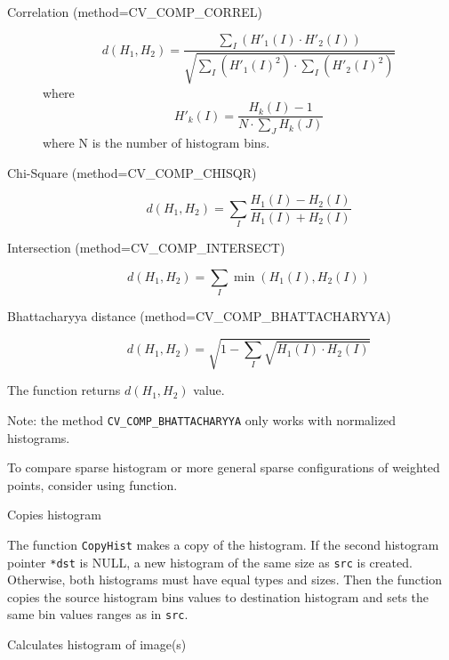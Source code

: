 \begin{description}
\item[Correlation (method=CV\_COMP\_CORREL)]
\[
d(H_1,H_2) = \frac
{\sum_I (H'_1(I) \cdot H'_2(I))}
{\sqrt{\sum_I(H'_1(I)^2) \cdot \sum_I(H'_2(I)^2)}}
\]
where
\[
H'_k(I) = \frac{H_k(I) - 1}{N \cdot \sum_J H_k(J)}
\]
where N is the number of histogram bins.

\item[Chi-Square (method=CV\_COMP\_CHISQR)]
\[ d(H_1,H_2) = \sum_I \frac{H_1(I)-H_2(I)}{H_1(I)+H_2(I)} \]

\item[Intersection (method=CV\_COMP\_INTERSECT)]
\[ d(H_1,H_2) = \sum_I \min (H_1(I), H_2(I)) \]

\item[Bhattacharyya distance (method=CV\_COMP\_BHATTACHARYYA)]
\[ d(H_1,H_2) = \sqrt{1 - \sum_I \sqrt{H_1(I) \cdot H_2(I)}} \]

\end{description}

The function returns $d(H_1, H_2)$ value.

Note: the method \texttt{CV\_COMP\_BHATTACHARYYA} only works with normalized histograms.

To compare sparse histogram or more general sparse configurations of weighted points, consider using  function.

\label{CopyHist}

Copies histogram


\begin{description}
\end{description}

The function \texttt{CopyHist} makes a copy of the histogram. If the
second histogram pointer \texttt{*dst} is NULL, a new histogram of the
same size as \texttt{src} is created. Otherwise, both histograms must
have equal types and sizes. Then the function copies the source histogram
bins values to destination histogram and sets the same bin values ranges
as in \texttt{src}.

\label{CalcHist}

Calculates histogram of image(s)


